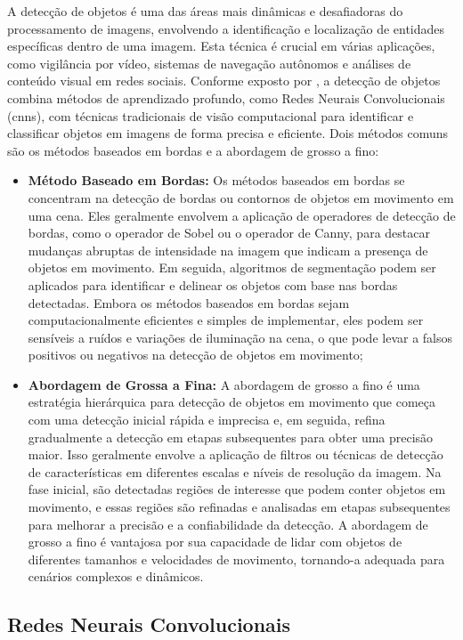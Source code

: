 A detecção de objetos é uma das áreas mais dinâmicas e desafiadoras do processamento de imagens, envolvendo a identificação e localização de entidades específicas dentro de uma imagem. Esta técnica é crucial em várias aplicações, como vigilância por vídeo, sistemas de navegação autônomos e análises de conteúdo visual em redes sociais. Conforme exposto por \cite{zhao2019object}, a detecção de objetos combina métodos de aprendizado profundo, como Redes Neurais Convolucionais (\gls{cnn}s), com técnicas tradicionais de visão computacional para identificar e classificar objetos em imagens de forma precisa e eficiente. Dois métodos comuns são os métodos baseados em bordas e a abordagem de grosso a fino:

\begin{itemize}
    \item \textbf{Método Baseado em Bordas:} Os métodos baseados em bordas se concentram na detecção de bordas ou contornos de objetos em movimento em uma cena. Eles geralmente envolvem a aplicação de operadores de detecção de bordas, como o operador de Sobel ou o operador de Canny, para destacar mudanças abruptas de intensidade na imagem que indicam a presença de objetos em movimento. Em seguida, algoritmos de segmentação podem ser aplicados para identificar e delinear os objetos com base nas bordas detectadas. Embora os métodos baseados em bordas sejam computacionalmente eficientes e simples de implementar, eles podem ser sensíveis a ruídos e variações de iluminação na cena, o que pode levar a falsos positivos ou negativos na detecção de objetos em movimento;
    \item \textbf{Abordagem de Grossa a Fina:} A abordagem de grosso a fino é uma estratégia hierárquica para detecção de objetos em movimento que começa com uma detecção inicial rápida e imprecisa e, em seguida, refina gradualmente a detecção em etapas subsequentes para obter uma precisão maior. Isso geralmente envolve a aplicação de filtros ou técnicas de detecção de características em diferentes escalas e níveis de resolução da imagem. Na fase inicial, são detectadas regiões de interesse que podem conter objetos em movimento, e essas regiões são refinadas e analisadas em etapas subsequentes para melhorar a precisão e a confiabilidade da detecção. A abordagem de grosso a fino é vantajosa por sua capacidade de lidar com objetos de diferentes tamanhos e velocidades de movimento, tornando-a adequada para cenários complexos e dinâmicos. 
\end{itemize}

 \subsection{Redes Neurais Convolucionais}\label{subsec:cnns}
 
